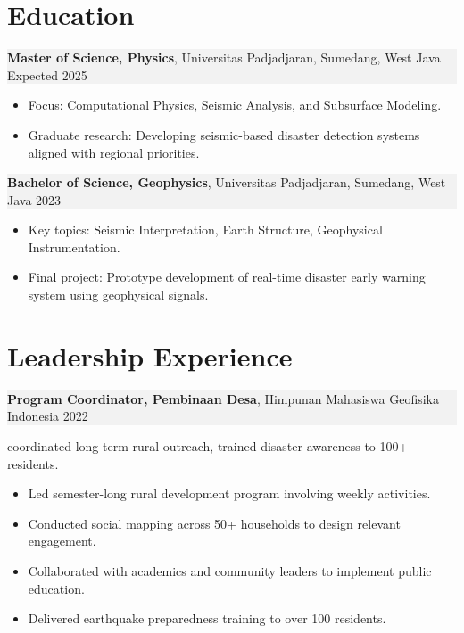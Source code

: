 \documentclass[11pt,a4paper]{article}
\begin{document}
\section*{Education}

\noindent
\setlength{\fboxsep}{0pt}%
\colorbox[HTML]{F2F2F2}{%
  \parbox{\linewidth}{%
    \textbf{Master of Science, Physics}, Universitas Padjadjaran, Sumedang, West Java \hfill Expected 2025%
  }%
}
\begin{itemize}[left=1.5em, noitemsep, topsep=0pt]
    \item Focus: Computational Physics, Seismic Analysis, and Subsurface Modeling.
    \item Graduate research: Developing seismic-based disaster detection systems aligned with regional priorities.
\end{itemize}

\noindent
\setlength{\fboxsep}{0pt}%
\colorbox[HTML]{F2F2F2}{%
  \parbox{\linewidth}{%
    \textbf{Bachelor of Science, Geophysics}, Universitas Padjadjaran, Sumedang, West Java \hfill 2023%
  }%
}
\begin{itemize}[left=1.5em, noitemsep, topsep=0pt]
    \item Key topics: Seismic Interpretation, Earth Structure, Geophysical Instrumentation.
    \item Final project: Prototype development of real-time disaster early warning system using geophysical signals.
\end{itemize}


\vspace{0.3em}

\section*{Leadership Experience}
\noindent 
\setlength{\fboxsep}{0pt}%
\colorbox[HTML]{F2F2F2}{%
  \parbox{\linewidth}{%
    \textbf{Program Coordinator, Pembinaan Desa}, Himpunan Mahasiswa Geofisika Indonesia \hfill 2022%
  }%
}
\vspace{0.3em}
coordinated long-term rural outreach, trained disaster awareness to 100+ residents.
\begin{itemize}[left=1.5em, noitemsep, topsep=0pt]
    \item Led semester-long rural development program involving weekly activities.
    \item Conducted social mapping across 50+ households to design relevant engagement.
    \item Collaborated with academics and community leaders to implement public education.
    \item Delivered earthquake preparedness training to over 100 residents.
\end{itemize}
\end{document}

